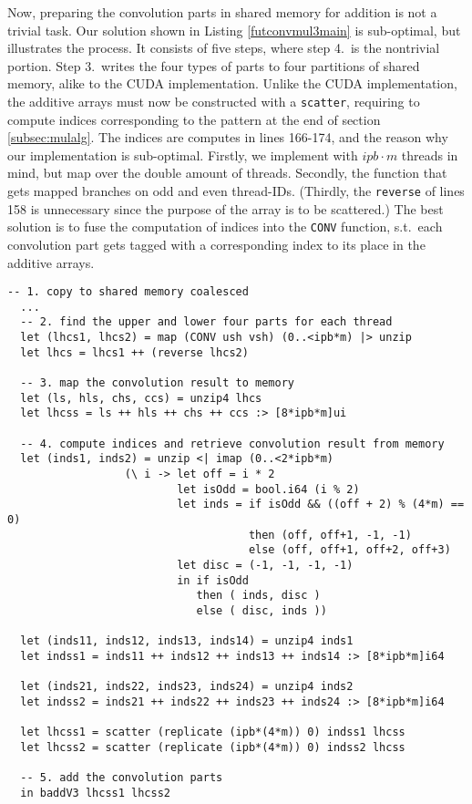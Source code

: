 Now, preparing the convolution parts in shared memory for addition is not a
trivial task. Our solution shown in Listing \ref{futconvmul3main} is
sub-optimal, but illustrates the process. It consists of five steps, where step
4.\ is the nontrivial portion. Step 3.\ writes the four types of parts to four
partitions of shared memory, alike to the CUDA implementation. Unlike the CUDA
implementation, the additive arrays must now be constructed with a
\texttt{scatter}, requiring to compute indices corresponding to the pattern at
the end of section \ref{subsec:mulalg}. The indices are computes in lines
166-174, and the reason why our implementation is sub-optimal. Firstly, we
implement with $\mathit{ipb} \cdot m$ threads in mind, but map over the double
amount of threads. Secondly, the function that gets mapped branches on odd and
even thread-IDs. (Thirdly, the \texttt{reverse} of lines 158 is unnecessary since
the purpose of the array is to be scattered.) The best solution is to fuse the
computation of indices into the \texttt{CONV} function, s.t.\ each convolution
part gets tagged with a corresponding index to its place in the additive arrays.

\begin{lstlisting}[language=futhark,caption={\footnotesize Futhark
\textit{convmul} \texttt{V3} adding the convolution parts from file \texttt{mul.fut} (slightly edited).},label={futconvmul3main},gobble=2,firstnumber=186]
  -- 1. copy to shared memory coalesced
  ...
  -- 2. find the upper and lower four parts for each thread
  let (lhcs1, lhcs2) = map (CONV ush vsh) (0..<ipb*m) |> unzip
  let lhcs = lhcs1 ++ (reverse lhcs2)

  -- 3. map the convolution result to memory
  let (ls, hls, chs, ccs) = unzip4 lhcs
  let lhcss = ls ++ hls ++ chs ++ ccs :> [8*ipb*m]ui

  -- 4. compute indices and retrieve convolution result from memory
  let (inds1, inds2) = unzip <| imap (0..<2*ipb*m)
                  (\ i -> let off = i * 2
                          let isOdd = bool.i64 (i % 2)
                          let inds = if isOdd && ((off + 2) % (4*m) == 0)
                                     then (off, off+1, -1, -1)
                                     else (off, off+1, off+2, off+3)
                          let disc = (-1, -1, -1, -1)
                          in if isOdd
                             then ( inds, disc )
                             else ( disc, inds ))

  let (inds11, inds12, inds13, inds14) = unzip4 inds1
  let indss1 = inds11 ++ inds12 ++ inds13 ++ inds14 :> [8*ipb*m]i64

  let (inds21, inds22, inds23, inds24) = unzip4 inds2
  let indss2 = inds21 ++ inds22 ++ inds23 ++ inds24 :> [8*ipb*m]i64

  let lhcss1 = scatter (replicate (ipb*(4*m)) 0) indss1 lhcss
  let lhcss2 = scatter (replicate (ipb*(4*m)) 0) indss2 lhcss

  -- 5. add the convolution parts
  in baddV3 lhcss1 lhcss2
\end{lstlisting}

